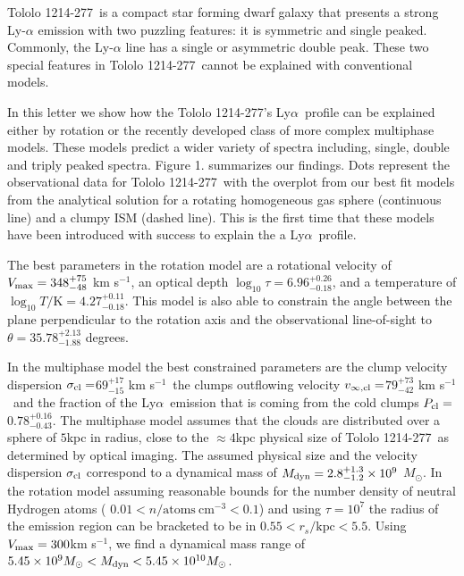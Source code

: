 \documentclass[a4paper, usenatbib, 12pt]{article}
\newcommand{\tol}{Tololo 1214-277}
\newcommand{\lya}{Ly$\alpha$}
\newcommand{\kms}{km s$^{-1}$}
\newcommand{\sigmaclump}{$69^{+17}_{-15}$ km s$^{-1}$}
\newcommand{\inftyclump}{$79^{+73}_{-42}$ km s$^{-1}$}
\newcommand{\probaclump}{$0.78^{+0.16}_{-0.43}$}
\begin{document}
{\tol\ is a compact star forming dwarf galaxy that presents a
strong Ly-$\alpha$ emission \cite{Thuan97} with two puzzling 
features: it is symmetric and single peaked.
Commonly, the Ly-$\alpha$ line has a single or asymmetric double peak. 
These two special features in \tol\ cannot be explained with
conventional models.  

In this letter we show how the \tol's \lya\ profile can be explained
either by rotation or the recently developed class of more complex
multiphase models. These models predict a wider variety of spectra
including, single, double and triply peaked spectra.  
Figure 1. summarizes our findings.
Dots represent the observational data for \tol\ with the
overplot from our best fit models from the analytical solution for a
rotating homogeneous gas sphere (continuous line) and a clumpy ISM
(dashed line).
This is the first time that these models have been introduced with
success to explain the a \lya\ profile.   


The best parameters in the rotation model are a rotational velocity of 
$V_{\rm max}=348^{+75}_{-48}$ \kms, an optical depth
$\log_{10}\tau=6.96^{+0.26}_{-0.18}$,  and a temperature of $\log_{10}
T/\mathrm {K} = 4.27^{+0.11}_{-0.18}$.  
This model is also able to constrain the angle between the plane
perpendicular to the rotation axis and the observational line-of-sight
to $\theta = 35.78^{+2.13}_{-1.88}$ degrees.

In the multiphase model the best constrained parameters are
the clump velocity dispersion  $\sigma_{\rm{cl}}=$\sigmaclump\
the clumps outflowing velocity $v_{\infty, \rm{cl}}=$\inftyclump\
and the fraction of the \lya\ emission that is  coming
from the cold clumps  $P_{\rm cl}=$\probaclump.
The multiphase model assumes that the clouds are distributed over a
sphere of $5$kpc in radius, close to the $\approx 4$kpc physical size
of \tol\ as determined by optical imaging.
The assumed physical size and the velocity dispersion $\sigma_{\rm
  cl}$ correspond to a  dynamical mass of  $M_{\rm
  dyn}=2.8^{+1.3}_{-1.2}\times 10^{9}$ $M_{\odot}$. In the rotation
model assuming reasonable bounds for the number density of neutral Hydrogen atoms (
$0.01<n/\mathrm{atoms\ cm^{-3}}<0.1$) and using $\tau=10^7$ the radius
of the emission region can be bracketed to be in $0.55 <
r_s/\mathrm{kpc}< 5.5$.
Using $V_{\rm max}=300$km s$^{-1}$, we find a dynamical mass range of
$5.45\times 10^{9}M_{\odot} < M_{\rm dyn} < 5.45\times 10^{10} M_{\odot}$.  

}
\end{document}
